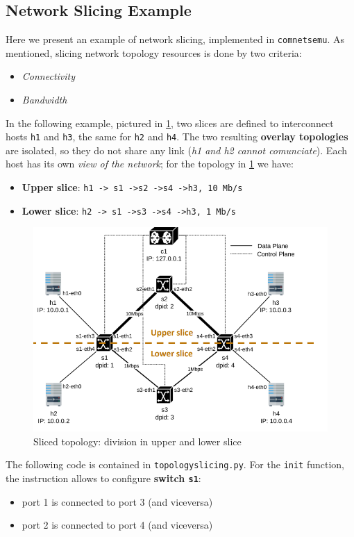 \documentclass[10pt,a4paper]{report}
\theoremstyle{definition}
\begin{document}
\subsection{Network Slicing Example}
Here we present an example of network slicing, implemented in \texttt{comnetsemu}. As mentioned, slicing network topology resources is done by two criteria:
\begin{itemize}
 \item \textit{Connectivity}
 \item \textit{Bandwidth}
\end{itemize}
In the following example, pictured in \ref{comnetsemu-topology}, two slices are defined to interconnect hosts \texttt{h1} and \texttt{h3}, the same for \texttt{h2} and \texttt{h4}. The two resulting \textbf{overlay topologies} are isolated, so they do not share any link (\textit{h1 and h2 cannot comunciate}). Each host has its own \textit{view of the network}; for the topology in \ref{comnetsemu-topology} we have:
\begin{itemize}
	\item \textbf{Upper slice}: \texttt{h1
		-> s1
		->s2
		->s4
		->h3, 10 Mb/s}
	\item \textbf{Lower slice}: \texttt{h2
		-> s1
		->s3
		->s4
		->h3, 1 Mb/s}
\end{itemize}
\begin{figure}[h]
	\centering\includegraphics[scale=0.50]{images/Pasted image 20230531155544.png}
	\caption{Sliced topology: division in upper and lower slice}
	\label{comnetsemu-topology}
\end{figure}

The following code is contained in \texttt{topologyslicing.py}. For the \texttt{init} function, the instruction allows to configure \textbf{switch \texttt{s1}}:
\begin{itemize}
	\item port 1 is connected to port 3 (and viceversa)
	
	\item  port 2 is connected to port 4 (and viceversa)
\end{itemize}
\end{document}

